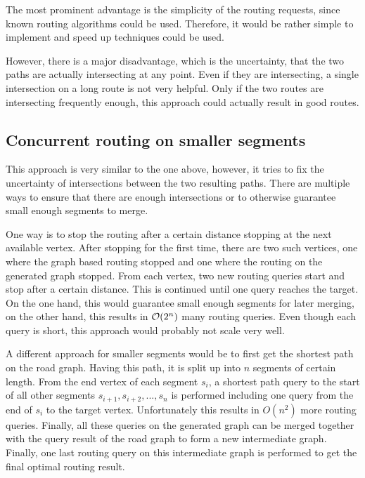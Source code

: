 		The most prominent advantage is the simplicity of the routing requests, since known routing algorithms could be used.
		Therefore, it would be rather simple to implement and speed up techniques could be used.
		
		However, there is a major disadvantage, which is the uncertainty, that the two paths are actually intersecting at any point.
		Even if they are intersecting, a single intersection on a long route is not very helpful.
		Only if the two routes are intersecting frequently enough, this approach could actually result in good routes.
	
	\subsection{Concurrent routing on smaller segments}
	
		This approach is very similar to the one above, however, it tries to fix the uncertainty of intersections between the two resulting paths.
		There are multiple ways to ensure that there are enough intersections or to otherwise guarantee small enough segments to merge.
		
		One way is to stop the routing after a certain distance stopping at the next available vertex.
		After stopping for the first time, there are two such vertices, one where the graph based routing stopped and one where the routing on the generated graph stopped.
		From each vertex, two new routing queries start and stop after a certain distance.
		This is continued until one query reaches the target.
		On the one hand, this would guarantee small enough segments for later merging, on the other hand, this results in $\mathcal{O}(2^n)$ many routing queries.
		Even though each query is short, this approach would probably not scale very well.
		
		A different approach for smaller segments would be to first get the shortest path on the road graph.
		Having this path, it is split up into $n$ segments of certain length.
		From the end vertex of each segment $s_i$, a shortest path query to the start of all other segments $s_{i+1}, s_{i+2}, ..., s_n$ is performed including one query from the end of $s_i$ to the target vertex.
		Unfortunately this results in $O(n^2)$ more routing queries.
		Finally, all these queries on the generated graph can be merged together with the query result of the road graph to form a new intermediate graph.
		Finally, one last routing query on this intermediate graph is performed to get the final optimal routing result.
		
